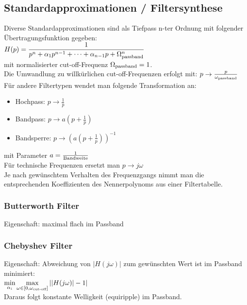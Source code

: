 \documentclass[a4paper,landscape,6pt]{article}
\begin{document}
\begin{multicols}{3}
\subsection*{Standardapproximationen / Filtersynthese}
Diverse Standardapproximationen sind als Tiefpass n-ter Ordnung mit folgender Übertragungsfunktion gegeben:\\

$H(p)=\dfrac{1}{p^n + \alpha_1 p^{n-1} + \dots + \alpha_{n-1} p + \Omega_{\textmd{passband}}^n}$\\

mit normalisierter cut-off-Frequenz $\Omega_{\textmd{passband}} = 1$.\\
Die Umwandlung zu willkürlichen cut-off-Frequenzen erfolgt mit: $p \rightarrow \frac{p}{\omega_{\textmd{passband}}}$\\ %
Für andere Filtertypen wendet man folgende Transformation an:
\begin{itemize}
	\item Hochpass: $p \rightarrow \frac{1}{p}$
	\item Bandpass: $p \rightarrow a(p + \frac{1}{p})$
	\item Bandsperre: $p \rightarrow (a(p + \frac{1}{p}))^{-1}$
\end{itemize}
mit Parameter $a = \frac{1}{\textmd{Bandweite}}$\\
Für technische Frequenzen ersetzt man $p \rightarrow j\omega$\\

Je nach gewünschtem Verhalten des Frequenzgangs nimmt man die entsprechenden Koeffizienten des Nennerpolynoms aus einer Filtertabelle. 

\subsubsection*{Butterworth Filter}
Eigenschaft: maximal flach im Passband

\subsubsection*{Chebyshev Filter}
Eigenschaft: Abweichung von $|H(j\omega)|$ zum gewünschten Wert ist im Passband minimiert:\\
$\min\limits_{\alpha_i} \max\limits_{\omega \in [0,\omega_{\textmd{cut-off}}]}||H(j\omega)| - 1|$ \\
Daraus folgt konstante Welligkeit (equiripple) im Passband.

\end{multicols}
\end{document}
